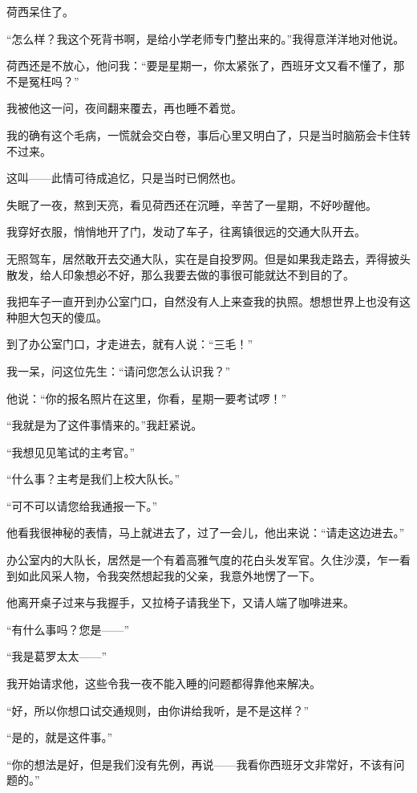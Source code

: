 \par 荷西呆住了。
\par “怎么样？我这个死背书啊，是给小学老师专门整出来的。”我得意洋洋地对他说。
\par 荷西还是不放心，他问我：“要是星期一，你太紧张了，西班牙文又看不懂了，那不是冤枉吗？”
\par 我被他这一问，夜间翻来覆去，再也睡不着觉。
\par 我的确有这个毛病，一慌就会交白卷，事后心里又明白了，只是当时脑筋会卡住转不过来。
\par 这叫——此情可待成追忆，只是当时已惘然也。
\par 失眠了一夜，熬到天亮，看见荷西还在沉睡，辛苦了一星期，不好吵醒他。
\par 我穿好衣服，悄悄地开了门，发动了车子，往离镇很远的交通大队开去。
\par 无照驾车，居然敢开去交通大队，实在是自投罗网。但是如果我走路去，弄得披头散发，给人印象想必不好，那么我要去做的事很可能就达不到目的了。
\par 我把车子一直开到办公室门口，自然没有人上来查我的执照。想想世界上也没有这种胆大包天的傻瓜。
\par 到了办公室门口，才走进去，就有人说：“三毛！”
\par 我一呆，问这位先生：“请问您怎么认识我？”
\par 他说：“你的报名照片在这里，你看，星期一要考试啰！”
\par “我就是为了这件事情来的。”我赶紧说。
\par “我想见见笔试的主考官。”
\par “什么事？主考是我们上校大队长。”
\par “可不可以请您给我通报一下。”
\par 他看我很神秘的表情，马上就进去了，过了一会儿，他出来说：“请走这边进去。”
\par 办公室内的大队长，居然是一个有着高雅气度的花白头发军官。久住沙漠，乍一看到如此风采人物，令我突然想起我的父亲，我意外地愣了一下。
\par 他离开桌子过来与我握手，又拉椅子请我坐下，又请人端了咖啡进来。
\par “有什么事吗？您是——”
\par “我是葛罗太太——”
\par 我开始请求他，这些令我一夜不能入睡的问题都得靠他来解决。
\par “好，所以你想口试交通规则，由你讲给我听，是不是这样？”
\par “是的，就是这件事。”
\par “你的想法是好，但是我们没有先例，再说——我看你西班牙文非常好，不该有问题的。”
